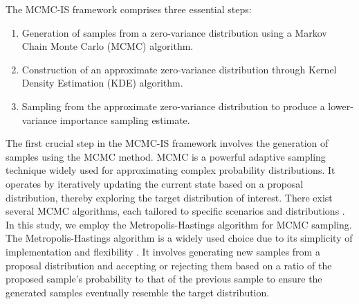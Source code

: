         The MCMC-IS framework comprises three essential steps:
        \begin{enumerate}
            \item Generation of samples from a zero-variance distribution using a Markov Chain Monte Carlo (MCMC) algorithm.
            \item Construction of an approximate zero-variance distribution through Kernel Density Estimation (KDE) algorithm.
            \item Sampling from the approximate zero-variance distribution to produce a lower-variance importance sampling estimate.
        \end{enumerate}

        The first crucial step in the MCMC-IS framework involves the generation of samples using the MCMC method. MCMC is a powerful adaptive sampling technique widely used for approximating complex probability distributions. It operates by iteratively updating the current state based on a proposal distribution, thereby exploring the target distribution of interest. There exist several MCMC algorithms, each tailored to specific scenarios and distributions \cite{gelman_handbook_2010}. In this study, we employ the Metropolis-Hastings algorithm for MCMC sampling. The Metropolis-Hastings algorithm is a widely used choice due to its simplicity of implementation and flexibility \cite{parpas_importance_2015}. It involves generating new samples from a proposal distribution and accepting or rejecting them based on a ratio of the proposed sample's probability to that of the previous sample to ensure the generated samples eventually resemble the target distribution.
        
